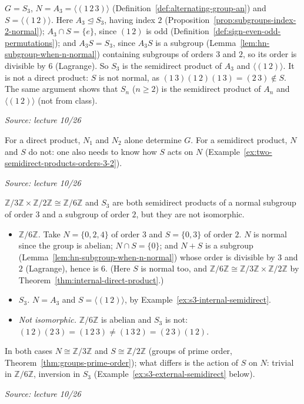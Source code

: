 \documentclass[11pt]{report}
\newcommand{\srcline}[1]{\par\hfill{\footnotesize\textit{Source: #1}}}
\begin{document}
\begin{exbox}[{$S_3$ and $S_n$}]\label{ex:s3-internal-semidirect}
$G = S_3$, $N = A_3 = \langle (1\,2\,3) \rangle$ (Definition~\ref{def:alternating-group-an}) and $S = \langle (1\,2) \rangle$. Here $A_3 \trianglelefteq S_3$, having index $2$ (Proposition~\ref{prop:subgroups-index-2-normal}); $A_3 \cap S = \{e\}$, since $(1\,2)$ is odd (Definition~\ref{def:sign-even-odd-permutations}); and $A_3S = S_3$, since $A_3S$ is a subgroup (Lemma~\ref{lem:hn-subgroup-when-n-normal}) containing subgroups of orders $3$ and $2$, so its order is divisible by $6$ (Lagrange). So $S_3$ is the semidirect product of $A_3$ and $\langle (1\,2) \rangle$. It is not a direct product: $S$ is not normal, as $(1\,3)(1\,2)(1\,3) = (2\,3) \notin S$. The same argument shows that $S_n$ ($n \geq 2$) is the semidirect product of $A_n$ and $\langle (1\,2) \rangle$ (not from class).
\srcline{lecture 10/26}
\end{exbox}

\begin{rembox}\label{rem:semidirect-more-data}
For a direct product, $N_1$ and $N_2$ alone determine $G$. For a semidirect product, $N$ and $S$ do not: one also needs to know how $S$ acts on $N$ (Example~\ref{ex:two-semidirect-products-orders-3-2}).
\srcline{lecture 10/26}
\end{rembox}

\begin{exbox}\label{ex:two-semidirect-products-orders-3-2}
$\mathbb{Z}/3\mathbb{Z} \times \mathbb{Z}/2\mathbb{Z} \cong \mathbb{Z}/6\mathbb{Z}$ and $S_3$ are both semidirect products of a normal subgroup of order $3$ and a subgroup of order $2$, but they are not isomorphic.
\begin{itemize}[nosep]
    \item \emph{$\mathbb{Z}/6\mathbb{Z}$.} Take $N = \{0, 2, 4\}$ of order $3$ and $S = \{0, 3\}$ of order $2$. $N$ is normal since the group is abelian; $N \cap S = \{0\}$; and $N + S$ is a subgroup (Lemma~\ref{lem:hn-subgroup-when-n-normal}) whose order is divisible by $3$ and $2$ (Lagrange), hence is $6$. (Here $S$ is normal too, and $\mathbb{Z}/6\mathbb{Z} \cong \mathbb{Z}/3\mathbb{Z} \times \mathbb{Z}/2\mathbb{Z}$ by Theorem~\ref{thm:internal-direct-product}.)
    \item \emph{$S_3$.} $N = A_3$ and $S = \langle (1\,2) \rangle$, by Example~\ref{ex:s3-internal-semidirect}.
    \item \emph{Not isomorphic.} $\mathbb{Z}/6\mathbb{Z}$ is abelian and $S_3$ is not: $(1\,2)(2\,3) = (1\,2\,3) \neq (1\,3\,2) = (2\,3)(1\,2)$.
\end{itemize}
In both cases $N \cong \mathbb{Z}/3\mathbb{Z}$ and $S \cong \mathbb{Z}/2\mathbb{Z}$ (groups of prime order, Theorem~\ref{thm:groups-prime-order}); what differs is the action of $S$ on $N$: trivial in $\mathbb{Z}/6\mathbb{Z}$, inversion in $S_3$ (Example~\ref{ex:s3-external-semidirect} below).
\srcline{lecture 10/26}
\end{exbox}
\end{document}
